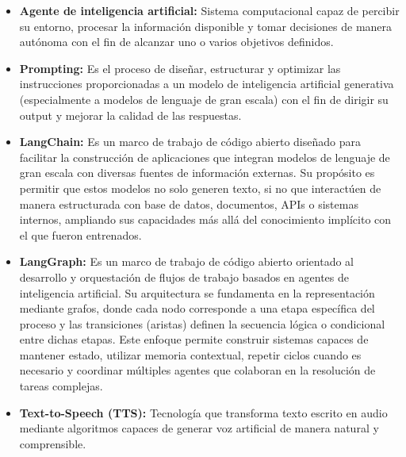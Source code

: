 \begin{itemize}
\item \textbf{Agente de inteligencia artificial:} Sistema computacional capaz de percibir su entorno, procesar la información disponible y tomar decisiones de manera autónoma con el fin de alcanzar uno o varios objetivos definidos.

\item \textbf{Prompting:} Es el proceso de diseñar, estructurar y optimizar las instrucciones proporcionadas a un modelo de inteligencia artificial generativa (especialmente a modelos de lenguaje de gran escala) con el fin de dirigir su output y mejorar la calidad de las respuestas.

\item \textbf{LangChain:} Es un marco de trabajo de código abierto diseñado para facilitar la construcción de aplicaciones que integran modelos de lenguaje de gran escala con diversas fuentes de información externas. Su propósito es permitir que estos modelos no solo generen texto, si no que interactúen de manera estructurada con base de datos, documentos, APIs o sistemas internos, ampliando sus capacidades más allá del conocimiento implícito con el que fueron entrenados.

\item \textbf{LangGraph:} Es un marco de trabajo de código abierto orientado al desarrollo y orquestación de flujos de trabajo basados en agentes de inteligencia artificial. Su arquitectura se fundamenta en la representación mediante grafos, donde cada nodo corresponde a una etapa específica del proceso y las transiciones (aristas) definen la secuencia lógica o condicional entre dichas etapas. Este enfoque permite construir sistemas capaces de mantener estado, utilizar memoria contextual, repetir ciclos cuando es necesario y coordinar múltiples agentes que colaboran en la resolución de tareas complejas.

\item \textbf{Text-to-Speech (TTS):} Tecnología que transforma texto escrito en audio mediante algoritmos capaces de generar voz artificial de manera natural y comprensible.

\end{itemize}